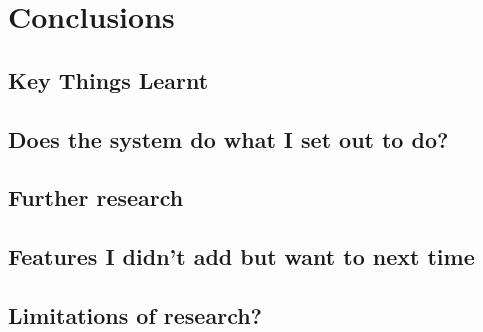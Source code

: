 \chapter{Conclusions}

\begin{comment}
Chapter 7: Conclusions
This can be a short chapter summarizing what you have achieved and what you have learned from the achievement. It is different from the abstract. The main results of your work should be highlighted with a critical appraisal of them indicating the extent to which the objectives outlined in Chapter 1 have been met. Exaggerated claims are counterproductive here. Recommendations for further activity are often included in this chapter.
\end{comment}

\section{Key Things Learnt}
\section{Does the system do what I set out to do?}
\section{Further research}
\section{Features I didn’t add but want to next time}
\section{Limitations of research?}




